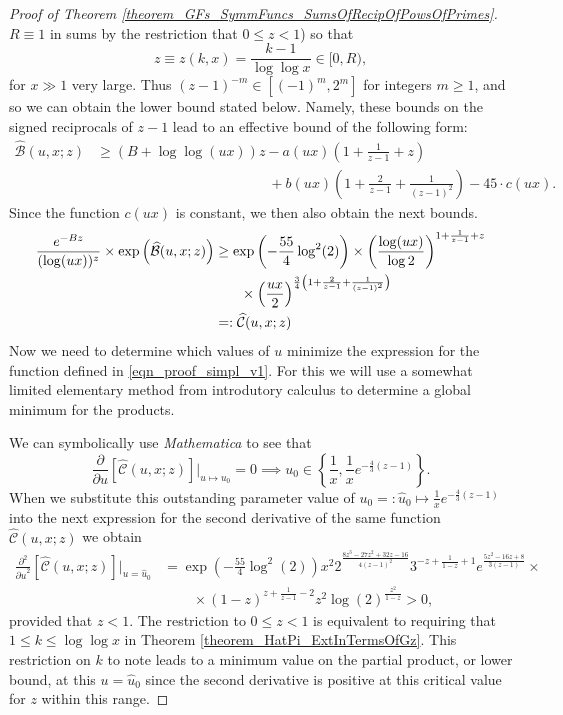 \documentclass[11pt,reqno,a4letter]{article}
\numberwithin{figure}{section}
\numberwithin{table}{section}
\theoremstyle{plain}
\numberwithin{theorem}{section}
\theoremstyle{definition}
\begin{document}
\begin{proof}[Proof of Theorem \ref{theorem_GFs_SymmFuncs_SumsOfRecipOfPowsOfPrimes}]
$R \equiv 1$ in sums by the restriction that $0 \leq z < 1$) so that 
$$z \equiv z(k, x) = \frac{k-1}{\log\log x} \in [0, R),$$ for $x \gg 1$ very large. 
Thus $(z-1)^{-m} \in [(-1)^m, 2^m]$ for integers $m \geq 1$, and so we can obtain the 
lower bound stated below. Namely, these bounds on the signed reciprocals of $z-1$ 
lead to an effective bound of the following form: 
\begin{align*} 
\widehat{\mathcal{B}}(u, x; z) & \geq (B + \log\log (ux)) z - a(ux) \left(1 + \frac{1}{z-1} + z\right) \\ 
     & \phantom{= (B + \log\log (ux)) z\ } + 
     b(ux) \left( 
     1 + \frac{2}{z-1} + \frac{1}{(z-1)^2}\right) - 
     45 \cdot c(ux). 
\end{align*} 
Since the function $c(ux)$ is constant, we then also obtain the next bounds. 
\begin{align} 
\notag 
\frac{e^{-Bz}}{(\log (ux))^{z}} \times \exp\left(\widehat{\mathcal{B}}(u, x; z)\right) & \geq 
    \exp\left(-\frac{55}{4} \log^2(2)\right) \times \left(\frac{\log(ux)}{\log 2}\right)^{1 + \frac{1}{z-1} + z} \\ 
\notag 
    & \phantom{\geq \times} \times \left(\frac{ux}{2}\right)^{\frac{3}{4}\left(1 + \frac{2}{z-1} + \frac{1}{(z-1)^2}\right)} \\ 
\label{eqn_proof_simpl_v1} 
     & =: \widehat{\mathcal{C}}(u, x; z) 
\end{align} 
Now we need to determine which values of $u$ minimize the expression for the function defined 
in \eqref{eqn_proof_simpl_v1}. 
For this we will use a somewhat limited elementary method from 
introdutory calculus to determine a global minimum for the products. 

We can symbolically use \emph{Mathematica} to see that 
\[
\frac{\partial}{\partial u}\left[\widehat{\mathcal{C}}(u, x; z)\right] \Biggr\rvert_{u \mapsto u_0} = 0 \implies 
     u_0 \in \left\{\frac{1}{x}, \frac{1}{x} e^{-\frac{4}{3}(z-1)}\right\}. 
\]
When we substitute this outstanding parameter value of $u_0 =: \hat{u}_0 \mapsto \frac{1}{x} e^{-\frac{4}{3}(z-1)}$ 
into the next expression for the second derivative of the same function 
$\widehat{\mathcal{C}}(u, x; z)$ we obtain 
\begin{align*} 
\frac{\partial^2}{{\partial u}^2}\left[\widehat{\mathcal{C}}(u, x; z)\right] \Biggr\rvert_{u = \hat{u}_0} & = 
     \exp\left(-\frac{55}{4} \log^2(2)\right) x^2 2^{\frac{8 z^3-27 z^2+32 z-16}{4 (z-1)^2}} 
     3^{-z+\frac{1}{1-z}+1} e^{\frac{5 z^2-16 z+8}{3 (z-1)}} \times \\ 
     & \phantom{=\times} \times (1-z)^{z+\frac{1}{z-1}-2} z^2
     \log(2)^{\frac{z^2}{1-z}} > 0, 
\end{align*} 
provided that $z < 1$. 
The restriction to $0 \leq z < 1$ is equivalent to requiring that 
$1 \leq k \leq \log\log x$ in Theorem \ref{theorem_HatPi_ExtInTermsOfGz}. 
This restriction on $k$ to note 
leads to a minimum value on the partial product, or lower bound, at this $u = \hat{u}_0$ 
since the second derivative is positive at this critical value for $z$ within this range. 


\end{proof}
\end{document}

